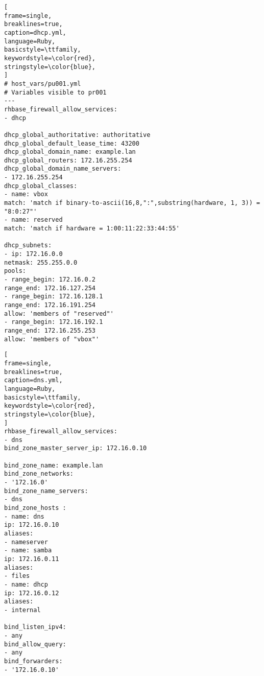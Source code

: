 \begin{lstlisting}[
frame=single,
breaklines=true,
caption=dhcp.yml,
language=Ruby,
basicstyle=\ttfamily,
keywordstyle=\color{red},
stringstyle=\color{blue},
]
# host_vars/pu001.yml
# Variables visible to pr001
---
rhbase_firewall_allow_services:
- dhcp

dhcp_global_authoritative: authoritative
dhcp_global_default_lease_time: 43200
dhcp_global_domain_name: example.lan
dhcp_global_routers: 172.16.255.254
dhcp_global_domain_name_servers:
- 172.16.255.254
dhcp_global_classes:
- name: vbox
match: 'match if binary-to-ascii(16,8,":",substring(hardware, 1, 3)) = "8:0:27"'
- name: reserved
match: 'match if hardware = 1:00:11:22:33:44:55'

dhcp_subnets:
- ip: 172.16.0.0
netmask: 255.255.0.0
pools:
- range_begin: 172.16.0.2
range_end: 172.16.127.254
- range_begin: 172.16.128.1
range_end: 172.16.191.254
allow: 'members of "reserved"'
- range_begin: 172.16.192.1
range_end: 172.16.255.253
allow: 'members of "vbox"'

\end{lstlisting}
\begin{lstlisting}[
frame=single,
breaklines=true,
caption=dns.yml,
language=Ruby,
basicstyle=\ttfamily,
keywordstyle=\color{red},
stringstyle=\color{blue},
]
rhbase_firewall_allow_services:
- dns
bind_zone_master_server_ip: 172.16.0.10

bind_zone_name: example.lan
bind_zone_networks:
- '172.16.0'
bind_zone_name_servers:
- dns
bind_zone_hosts	:
- name: dns
ip: 172.16.0.10
aliases:
- nameserver
- name: samba
ip: 172.16.0.11
aliases:
- files
- name: dhcp
ip: 172.16.0.12
aliases:
- internal

bind_listen_ipv4:
- any
bind_allow_query:
- any
bind_forwarders:
- '172.16.0.10'

\end{lstlisting}
